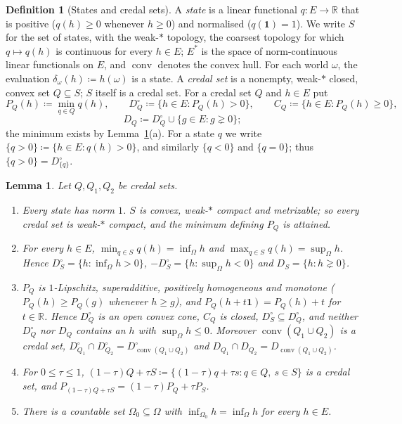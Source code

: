 \documentclass[11pt]{article}
\newcommand{\R}{\mathbb{R}}
\newcommand{\one}{\mathbf{1}}
\DeclareMathOperator{\conv}{conv}
\theoremstyle{plain}
\newtheorem{lemma}[theorem]{Lemma}
\theoremstyle{definition}
\newtheorem{definition}[theorem]{Definition}
\begin{document}
\begin{definition}[States and credal sets]\label{def:states}
A \emph{state} is a linear functional $q:E\to\R$ that is positive ($q(h)\ge0$ whenever
$h\ge0$) and normalised ($q(\one)=1$). We write $S$ for the set of states, with the
weak-$\ast$ topology, the coarsest topology for which $q\mapsto q(h)$ is continuous for every
$h\in E$; $E^\ast$ is the space of norm-continuous linear functionals on $E$, and $\conv$
denotes the convex hull. For each world $\omega$, the evaluation $\delta_\omega(h)\coloneqq h(\omega)$ is a
state. A \emph{credal set} is a nonempty, weak-$\ast$ closed, convex set $Q\subseteq S$; $S$
itself is a credal set. For a credal set $Q$ and $h\in E$ put
\[
  P_Q(h)\coloneqq\min_{q\in Q}q(h),\qquad D_Q^\circ\coloneqq\{h\in E:P_Q(h)>0\},\qquad
  C_Q\coloneqq\{h\in E:P_Q(h)\ge0\},
\]
\[
  D_Q\coloneqq D_Q^\circ\cup\{g\in E:g\gneq0\};
\]
the minimum exists by Lemma~\ref{lem:states}(a). For a state $q$ we write $\{q>0\}\coloneqq
\{h\in E:q(h)>0\}$, and similarly $\{q<0\}$ and $\{q=0\}$; thus $\{q>0\}=D^\circ_{\{q\}}$.
\end{definition}

\begin{lemma}\label{lem:states}
Let $Q,Q_1,Q_2$ be credal sets.
\begin{enumerate}[label=(\alph*)]
  \item Every state has norm $1$. $S$ is convex, weak-$\ast$ compact and metrizable; so every
  credal set is weak-$\ast$ compact, and the minimum defining $P_Q$ is attained.
  \item For every $h\in E$, $\min_{q\in S}q(h)=\inf_\Omega h$ and $\max_{q\in S}q(h)=
  \sup_\Omega h$. Hence $D_S^\circ=\{h:\inf_\Omega h>0\}$, $-D_S^\circ=\{h:\sup_\Omega h<0\}$
  and $D_S=\{h:h\gneq0\}$.
  \item $P_Q$ is $1$-Lipschitz, superadditive, positively homogeneous and monotone ($P_Q(h)\ge
  P_Q(g)$ whenever $h\ge g$), and $P_Q(h+t\one)=P_Q(h)+t$ for $t\in\R$. Hence $D_Q^\circ$ is an
  open convex cone, $C_Q$ is closed, $D_S^\circ\subseteq D_Q^\circ$, and neither $D_Q^\circ$
  nor $D_Q$ contains an $h$ with $\sup_\Omega h\le0$. Moreover $\conv(Q_1\cup Q_2)$ is a credal
  set, $D^\circ_{Q_1}\cap D^\circ_{Q_2}=D^\circ_{\conv(Q_1\cup Q_2)}$ and $D_{Q_1}\cap D_{Q_2}=
  D_{\conv(Q_1\cup Q_2)}$.
  \item For $0\le\tau\le1$, $(1-\tau)Q+\tau S\coloneqq\{(1-\tau)q+\tau s:q\in Q,\ s\in S\}$ is a
  credal set, and $P_{(1-\tau)Q+\tau S}=
  (1-\tau)P_Q+\tau P_S$.
  \item There is a countable set $\Omega_0\subseteq\Omega$ with $\inf_{\Omega_0}h=\inf_\Omega h$
  for every $h\in E$.
\end{enumerate}
\end{lemma}
\end{document}
